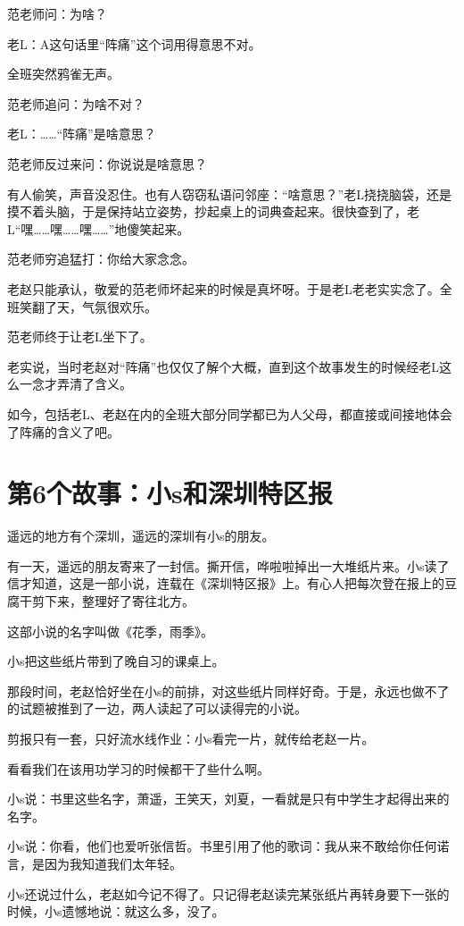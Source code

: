 \documentclass[openany]{ctexbook}
\begin{document}
范老师问：为啥？

老L：A这句话里``阵痛''这个词用得意思不对。

全班突然鸦雀无声。

范老师追问：为啥不对？

老L：\ldots{}\ldots{}``阵痛''是啥意思？

范老师反过来问：你说说是啥意思？

有人偷笑，声音没忍住。也有人窃窃私语问邻座：``啥意思？''老L挠挠脑袋，还是摸不着头脑，于是保持站立姿势，抄起桌上的词典查起来。很快查到了，老L``嘿\ldots{}\ldots{}嘿\ldots{}\ldots{}嘿\ldots{}\ldots{}''地傻笑起来。

范老师穷追猛打：你给大家念念。

老赵只能承认，敬爱的范老师坏起来的时候是真坏呀。于是老L老老实实念了。全班笑翻了天，气氛很欢乐。

范老师终于让老L坐下了。

老实说，当时老赵对``阵痛''也仅仅了解个大概，直到这个故事发生的时候经老L这么一念才弄清了含义。

如今，包括老L、老赵在内的全班大部分同学都已为人父母，都直接或间接地体会了阵痛的含义了吧。

\chapter*{第6个故事：小s和深圳特区报}\label{s6}

遥远的地方有个深圳，遥远的深圳有小s的朋友。

有一天，遥远的朋友寄来了一封信。撕开信，哗啦啦掉出一大堆纸片来。小s读了信才知道，这是一部小说，连载在《深圳特区报》上。有心人把每次登在报上的豆腐干剪下来，整理好了寄往北方。

这部小说的名字叫做《花季，雨季》。

小s把这些纸片带到了晚自习的课桌上。

那段时间，老赵恰好坐在小s的前排，对这些纸片同样好奇。于是，永远也做不了的试题被推到了一边，两人读起了可以读得完的小说。

剪报只有一套，只好流水线作业：小s看完一片，就传给老赵一片。

看看我们在该用功学习的时候都干了些什么啊。

小s说：书里这些名字，萧遥，王笑天，刘夏，一看就是只有中学生才起得出来的名字。

小s说：你看，他们也爱听张信哲。书里引用了他的歌词：我从来不敢给你任何诺言，是因为我知道我们太年轻。

小s还说过什么，老赵如今记不得了。只记得老赵读完某张纸片再转身要下一张的时候，小s遗憾地说：就这么多，没了。
\end{document}
